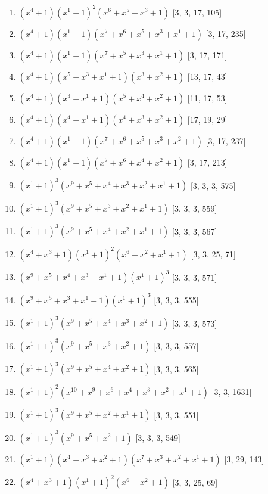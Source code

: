 \documentclass[10pt,twocolumn]{article}
\begin{document}
\begin{enumerate}
\item $(x^{4} + 1)(x^{1} + 1)^{2}(x^{6} + x^{5} + x^{3} + 1)$  [3, 3, 17, 105]
\item $(x^{4} + 1)(x^{1} + 1)(x^{7} + x^{6} + x^{5} + x^{3} + x^{1} + 1)$  [3, 17, 235]
\item $(x^{4} + 1)(x^{1} + 1)(x^{7} + x^{5} + x^{3} + x^{1} + 1)$  [3, 17, 171]
\item $(x^{4} + 1)(x^{5} + x^{3} + x^{1} + 1)(x^{3} + x^{2} + 1)$  [13, 17, 43]
\item $(x^{4} + 1)(x^{3} + x^{1} + 1)(x^{5} + x^{4} + x^{2} + 1)$  [11, 17, 53]
\item $(x^{4} + 1)(x^{4} + x^{1} + 1)(x^{4} + x^{3} + x^{2} + 1)$  [17, 19, 29]
\item $(x^{4} + 1)(x^{1} + 1)(x^{7} + x^{6} + x^{5} + x^{3} + x^{2} + 1)$  [3, 17, 237]
\item $(x^{4} + 1)(x^{1} + 1)(x^{7} + x^{6} + x^{4} + x^{2} + 1)$  [3, 17, 213]
\item $(x^{1} + 1)^{3}(x^{9} + x^{5} + x^{4} + x^{3} + x^{2} + x^{1} + 1)$  [3, 3, 3, 575]
\item $(x^{1} + 1)^{3}(x^{9} + x^{5} + x^{3} + x^{2} + x^{1} + 1)$  [3, 3, 3, 559]
\item $(x^{1} + 1)^{3}(x^{9} + x^{5} + x^{4} + x^{2} + x^{1} + 1)$  [3, 3, 3, 567]
\item $(x^{4} + x^{3} + 1)(x^{1} + 1)^{2}(x^{6} + x^{2} + x^{1} + 1)$  [3, 3, 25, 71]
\item $(x^{9} + x^{5} + x^{4} + x^{3} + x^{1} + 1)(x^{1} + 1)^{3}$  [3, 3, 3, 571]
\item $(x^{9} + x^{5} + x^{3} + x^{1} + 1)(x^{1} + 1)^{3}$  [3, 3, 3, 555]
\item $(x^{1} + 1)^{3}(x^{9} + x^{5} + x^{4} + x^{3} + x^{2} + 1)$  [3, 3, 3, 573]
\item $(x^{1} + 1)^{3}(x^{9} + x^{5} + x^{3} + x^{2} + 1)$  [3, 3, 3, 557]
\item $(x^{1} + 1)^{3}(x^{9} + x^{5} + x^{4} + x^{2} + 1)$  [3, 3, 3, 565]
\item $(x^{1} + 1)^{2}(x^{10} + x^{9} + x^{6} + x^{4} + x^{3} + x^{2} + x^{1} + 1)$  [3, 3, 1631]
\item $(x^{1} + 1)^{3}(x^{9} + x^{5} + x^{2} + x^{1} + 1)$  [3, 3, 3, 551]
\item $(x^{1} + 1)^{3}(x^{9} + x^{5} + x^{2} + 1)$  [3, 3, 3, 549]
\item $(x^{1} + 1)(x^{4} + x^{3} + x^{2} + 1)(x^{7} + x^{3} + x^{2} + x^{1} + 1)$  [3, 29, 143]
\item $(x^{4} + x^{3} + 1)(x^{1} + 1)^{2}(x^{6} + x^{2} + 1)$  [3, 3, 25, 69]

\end{enumerate}
\end{document}
